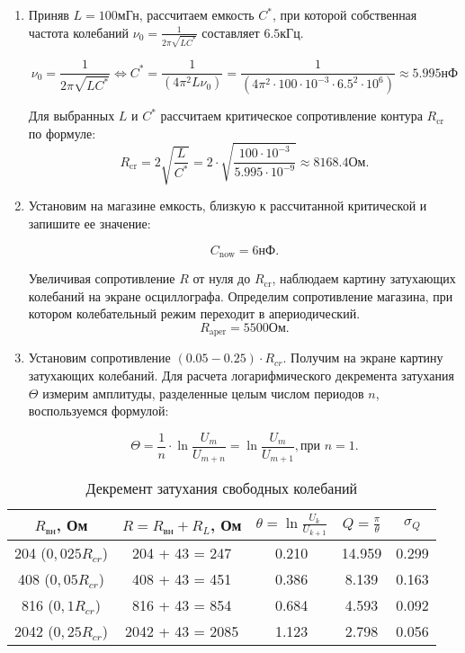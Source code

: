 \documentclass[a4paper,12pt]{article} %
\begin{document}
\begin{enumerate}
    \item Приняв $L = 100 \text{мГн}$, рассчитаем емкость $C^*$, при которой собственная частота колебаний $\nu_0 = \frac{1}{2\pi \sqrt{LC^*}}$ составляет $6.5 \text{кГц}$. 
    
    \[ \nu_0 = \frac{1}{2\pi \sqrt{LC^*}} \Longleftrightarrow C^* = \frac{1}{(4\pi^2L\nu_{0})} = \frac{1}{(4\pi^2\cdot100\cdot10^{-3}\cdot6.5^2\cdot10^6)} \approx 5.995 \text{нФ} \]
    
    Для выбранных $L$ и $C^*$ рассчитаем критическое сопротивление контура $R_{\text{cr}}$ по формуле:
    \[ R_{\text{cr}} = 2\sqrt{\frac{L}{C^*}} = 2 \cdot \sqrt{\frac{100 \cdot 10^{-3}}{5.995 \cdot 10^{-9}}} \approx 8168.4 \text{Ом}. \]

    \item Установим на магазине емкость, близкую к рассчитанной критической и запишите ее значение:
    
    \[ C_{\text{now}} = 6 \text{нФ}. \]
    
    Увеличивая сопротивление $R$ от нуля до $R_{\text{cr}}$, наблюдаем картину затухающих колебаний на экране осциллографа. Определим сопротивление магазина, при котором колебательный режим переходит в апериодический.
    \[ R_{\text{aper}} = 5500 \text{Ом}. \]

    \item Установим сопротивление $(0.05 - 0.25) \cdot R_{cr}$. Получим на экране картину затухающих колебаний. Для расчета логарифмического декремента затухания $\Theta$ измерим амплитуды, разделенные целым числом периодов $n$, воспользуемся формулой:

    \[ \Theta = \frac{1}{n} \cdot \ln{\frac{U_{m}}{U_{m+n}}} = \ln{\frac{U_{m}}{U_{m+1}}}, \text{при } n = 1. \]

\end{enumerate}

    \begin{table}[h]
		\centering
		\begin{tabular}{|c|c|c|c|c|}
			\hline
			$R_{\text{вн}}$, Ом & $R = R_{\text{вн}} + R_L$, Ом& $\theta = \ln \frac{U_k}{U_{k+1}}$ & $Q = \frac{\pi}{\theta}$ & $\sigma_{Q}$ \\ \hline
			 204 ($0,025R_{cr}$) & 204 + 43 = 247 & 0.210 & 14.959 & 0.299 \\ \hline
		408 ($0,05R_{cr}$) & 408 + 43 = 451 & 0.386 & 8.139 & 0.163  \\ \hline
			816 ($0,1R_{cr}$) & 816 + 43 = 854 & 0.684 & 4.593 & 0.092 \\ \hline
			 2042 ($0,25R_{cr}$) & 2042 + 43 = 2085 & 1.123 & 2.798 & 0.056 \\ \hline
		\end{tabular}
		\caption{Декремент затухания свободных колебаний}
	\end{table}
\end{document}
